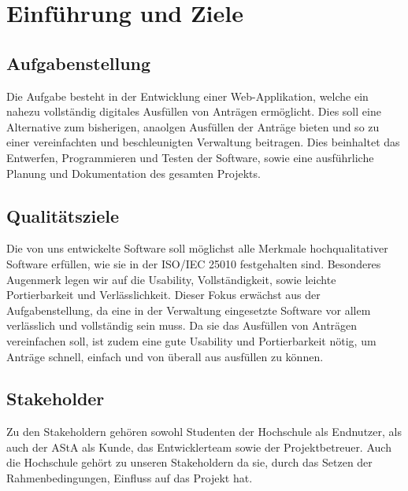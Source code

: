 \chapter{Einführung und Ziele}\label{ch:einfuhrung-und-ziele}

\section{Aufgabenstellung}\label{sec:aufgabenstellung}
Die Aufgabe besteht in der Entwicklung einer Web-Applikation, welche ein nahezu vollständig digitales
Ausfüllen von Anträgen ermöglicht. Dies soll eine Alternative zum bisherigen, anaolgen Ausfüllen der Anträge bieten und so zu einer vereinfachten und beschleunigten Verwaltung beitragen.
Dies beinhaltet das Entwerfen, Programmieren und Testen der Software, sowie eine ausführliche Planung und Dokumentation des gesamten Projekts.

\section{Qualitätsziele}\label{sec:qualitatsziele}
Die von uns entwickelte Software soll möglichst alle Merkmale hochqualitativer Software erfüllen, wie 
sie in der ISO/IEC 25010 festgehalten sind. Besonderes Augenmerk legen wir auf die Usability, 
Vollständigkeit, sowie leichte Portierbarkeit und Verlässlichkeit. Dieser Fokus erwächst aus der
Aufgabenstellung, da eine in der Verwaltung eingesetzte Software vor allem verlässlich und vollständig
sein muss. Da sie das Ausfüllen von Anträgen vereinfachen soll, ist zudem eine gute Usability und
Portierbarkeit nötig, um Anträge schnell, einfach und von überall aus ausfüllen zu können.

\section{Stakeholder}\label{sec:stakeholder}
Zu den Stakeholdern gehören sowohl Studenten der Hochschule als Endnutzer, als auch
der \ac{AStA} als Kunde, das Entwicklerteam sowie der Projektbetreuer. Auch die Hochschule
gehört zu unseren Stakeholdern da sie, durch das Setzen der Rahmenbedingungen, Einfluss auf das 
Projekt hat.
